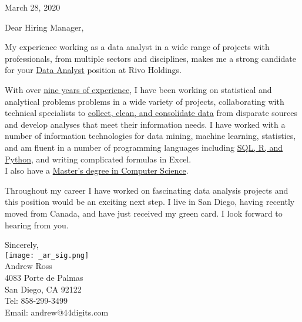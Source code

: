 \documentclass[letterpaper]{article}
\newcommand{\CVjobTitle}{Data Analyst}
\newcommand{\CVcompany}{Rivo Holdings}
\newcommand{\impt}[1]{\uline{#1}}
\begin{document}
\large

\null\hfill March 28, 2020
\vspace{1em}

Dear Hiring Manager,

My experience working as a data analyst in a wide range of
projects with professionals, from multiple sectors and disciplines, makes me a
strong candidate for your \impt{\CVjobTitle} position at \CVcompany.

With over \impt{nine years of experience}, I have been working on statistical and
analytical problems
problems in a wide variety of projects, collaborating with technical specialists to
\impt{collect, clean, and consolidate data} from disparate sources and develop analyses
that meet their information needs.
I have worked with a number of information technologies for 
data mining, machine learning, statistics,
and am fluent in a number of programming languages including \impt{SQL, R, and
Python}, and writing complicated formulas in Excel. \\
I also have a \impt{Master's degree in Computer Science}.

Throughout my career I have worked on fascinating data analysis
projects and this position would be an exciting next step.  
I live in San Diego, having recently moved from Canada, and have just received
my green card. I look forward to hearing from you.  


Sincerely,\\
\hspace{1em} \texttt{[image: \_ar\_sig.png]} \\
Andrew Ross \\
\small
4083 Porte de Palmas \\
San Diego, CA  92122 \\
Tel: 858-299-3499 \\
Email: andrew@44digits.com
\end{document}
